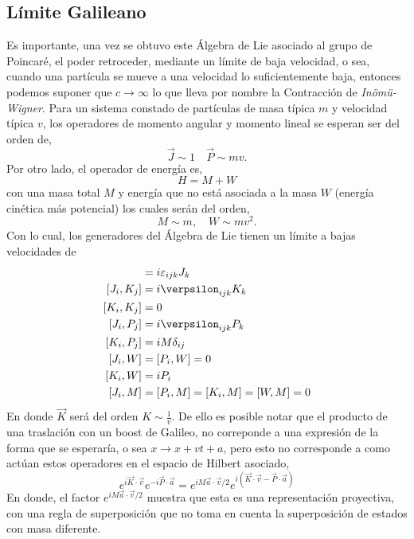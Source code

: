 \documentclass[12pt,letterpaper]{article}
\begin{document}
\subsection{Límite Galileano}
Es importante, una vez se obtuvo este Álgebra de Lie asociado al grupo de Poincaré, el poder retroceder, mediante un límite de baja velocidad, o sea, cuando una partícula se mueve a una velocidad lo suficientemente baja, entonces podemos suponer que $c\to\infty$ lo que lleva por nombre la Contracción de \emph{Inömü-Wigner}. Para un sistema constado de partículas de masa típica $m$ y velocidad típica $v$, los operadores de momento angular y momento lineal se esperan ser del orden de,
\begin{equation}
  \vec{J}\sim 1\quad \vec{P}\sim mv.
 \end{equation}
Por otro lado, el operador de energía es,
\begin{equation}
  H = M + W
 \end{equation}
 con una masa total $M$ y energía que no está asociada a la masa $W$ (energía cinética más potencial) los cuales serán del orden,
 \begin{equation}
   M\sim m,\quad W\sim mv^2.
  \end{equation}
  Con lo cual, los generadores del Álgebra de Lie tienen un límite a bajas velocidades de
  \begin{align}
    [J_i,J_j] & = i\varepsilon_{ijk}J_k \\
    [J_i,K_j] & = i\verpsilon_{ijk} K_k \\
    [K_i,K_j] & = 0 \\
    [J_i,P_j] & = i\verpsilon_{ijk}P_k \\
    [K_i,P_j] & = iM\delta_{ij} \\
    [J_i,W]   & = [P_i,W] = 0 \\
    [K_i,W]   & = iP_i \\
    [J_i,M]   & = [P_i,M] = [K_i,M] = [W,M] = 0
  \end{align}
En donde $\vec{K}$ será del orden $K\sim\frac{1}{v}$. De ello es posible notar que el producto de una traslación con un boost de Galileo, no correponde a una expresión de la forma que se esperaría, o sea $x\to x+vt+a$, pero esto no corresponde a como actúan estos operadores en el espacio de Hilbert asociado,
\begin{equation}
  e^{i\vec{K}\cdot\vec{v}} e^{-i\vec{P}\cdot\vec{a}} = e^{iM\vec{a}\cdot\vec{v}/2} e^{i(\vec{K}\cdot\vec{v}-\vec{P}\cdot\vec{a})}
 \end{equation}
 En donde, el factor $e^{iM\vec{a}\cdot\vec{v}/2}$ muestra que esta es una representación proyectiva, con una regla de superposición que no toma en cuenta la superposición de estados con masa diferente.  
\end{document}
